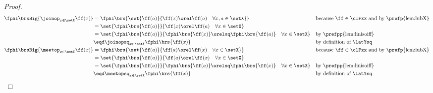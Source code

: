 \begin{proof}
\begin{align*}
  \fphi\brsBig{\joinop_{x\in\setX}\ff(x)}
    &= \fphi\brs{\set{\ff(a)}{\ff(x)\orel\ff(a)\quad\forall x,a\in\setX}}
    && \text{because $\ff\in\clFxx$ and by \prefp{lem:lubX}}
  \\&= \set{\fphi\brs{\ff(a)}}{\ff(x)\orel\ff(a)\quad\forall x\in\setX}
  \\&= \set{\fphi\brs{\ff(a)}}{\fphi\brs{\ff(x)}\orelsq\fphi\brs{\ff(a)}\quad\forall x\in\setX}
    && \text{by \prefpp{lem:linisoiff}}
  \\&\eqd \joinopsq_{x\in\setX} \fphi\brs{\ff(x)}
    && \text{by definition of $\latYsq$}
  \\
  \fphi\brsBig{\meetop_{x\in\setX}\ff(x)}
    &= \fphi\brs{\set{\ff(a)}{\ff(a)\orel\ff(x)\quad\forall x\in\setX}}
    && \text{because $\ff\in\clFxx$ and by \prefp{lem:lubX}}
  \\&= \set{\fphi\brs{\ff(a)}}{\ff(a)\orel\ff(x)\quad\forall x\in\setX}
  \\&= \set{\fphi\brs{\ff(a)}}{\fphi\brs{\ff(a)}\orelsq\fphi\brs{\ff(x)}\quad\forall x\in\setX}
    && \text{by \prefpp{lem:linisoiff}}
  \\&\eqd \meetopsq_{x\in\setX} \fphi\brs{\ff(x)}
    && \text{by definition of $\latYsq$}
  \\
\end{align*}
\end{proof}


